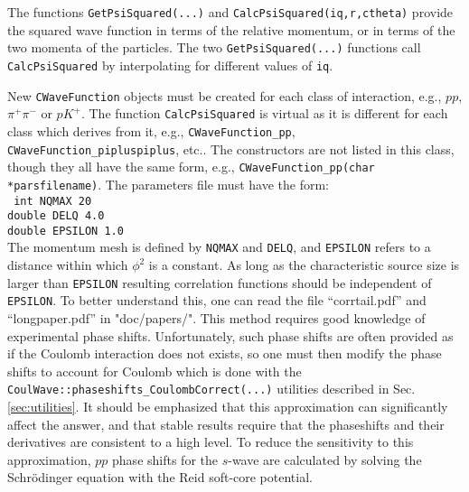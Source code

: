 \documentclass[10pt]{article}
\begin{document}
The functions {\tt GetPsiSquared(...)} and {\tt CalcPsiSquared(iq,r,ctheta)} provide the squared wave function in terms of the relative momentum, or in terms of the two momenta of the particles. The two {\tt GetPsiSquared(...)} functions call {\tt CalcPsiSquared} by interpolating for different values of {\tt iq}.

New {\tt CWaveFunction} objects must be created for each class of interaction, e.g., $pp$, $\pi^+\pi^-$ or $pK^+$. The function {\tt CalcPsiSquared} is virtual as it is different for each class which derives from it, e.g., {\tt CWaveFunction\_pp}, {\tt CWaveFunction\_pipluspiplus}, etc.. The constructors are not listed in this class, though they all have the same form, e.g., {\tt CWaveFunction\_pp(char *parsfilename)}. The parameters file must have the form:\\
{\tt
int NQMAX 20\\
double DELQ 4.0\\
double EPSILON 1.0\\
}
The momentum mesh is defined by {\tt NQMAX} and {\tt DELQ}, and {\tt EPSILON} refers to a distance within which $\phi^2$ is a constant. As long as the characteristic source size is larger than {\tt EPSILON} resulting correlation functions should be independent of {\tt EPSILON}. To better understand this, one can read the file ``corrtail.pdf'' and ``longpaper.pdf'' in "doc/papers/". This method requires good knowledge of experimental phase shifts. Unfortunately, such phase shifts are often provided as if the Coulomb interaction does not exists, so one must then modify the phase shifts to account for Coulomb which is done with the {\tt CoulWave::phaseshifts\_CoulombCorrect(...)} utilities described in Sec. \ref{sec:utilities}. It should be emphasized that this approximation can significantly affect the answer, and that stable results require that the phaseshifts and their derivatives are consistent to a high level. To reduce the sensitivity to this approximation, $pp$ phase shifts for the $s$-wave are calculated by solving the Schr\"odinger equation with the Reid soft-core potential.
\end{document}
